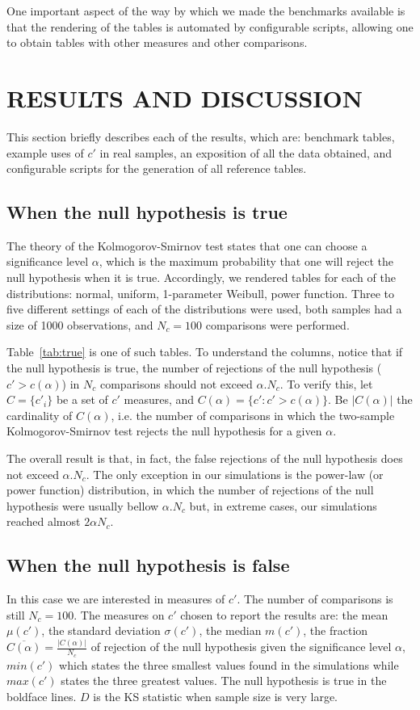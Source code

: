 \documentclass[12pt,fleqn]{article}
\begin{document}
One important aspect of the way by which we made the
benchmarks available is that the rendering of the tables
is automated by configurable scripts,
allowing one to obtain tables with other measures
and other comparisons.

\section{RESULTS AND DISCUSSION}\label{sec:res}
This section briefly describes each of the
results, which are: benchmark tables, example uses of $c'$ in
real samples, an exposition of all the data obtained,
and configurable scripts for the generation of all reference tables.

\subsection{When the null hypothesis is true}\label{sec:true}
The theory of the Kolmogorov-Smirnov test
states that one can choose a significance level $\alpha$,
which is the maximum probability that one will reject the
null hypothesis when it is true.
Accordingly,
we rendered tables for each of the distributions:
normal, uniform, 1-parameter Weibull, power function.
Three to five different settings of each of the distributions
were used, both samples had a size of 1000 observations,
and $N_c=100$ comparisons were performed.

Table~\ref{tab:true} is one of such tables.
To understand the columns, notice that
if the null hypothesis is true, the number
of rejections of the null hypothesis ($c'>c(\alpha)$)
in $N_c$ comparisons should not exceed $\alpha . N_c$.
To verify this, let $C=\{c'_i\}$ be a set of $c'$ measures,
and $C(\alpha)=\{c' : c'>c(\alpha)\}$.
Be $|C(\alpha)|$ the cardinality of $C(\alpha)$,
i.e. the number of comparisons in which the two-sample Kolmogorov-Smirnov
test rejects the null hypothesis for a given $\alpha$.

The overall result is that, in fact, the false rejections of the null hypothesis
does not exceed $\alpha . N_c$.
The only exception in our simulations is the power-law (or power function) distribution,
in which the number of rejections of the null hypothesis were usually bellow $\alpha . N_c$
but, in extreme cases, our simulations reached almost $2\alpha N_c$.



\subsection{When the null hypothesis is false}\label{sec:false}
In this case we are interested in measures of $c'$.
The number of comparisons is still $N_c=100$.
The measures on $c'$ chosen to report the results are:
the mean $\mu(c')$, the standard deviation $\sigma(c')$,
the median $m(c')$,
the  fraction
$\overline{C(\alpha)}=\frac{|C(\alpha)|}{N_c}$
of rejection of the null hypothesis given the significance level $\alpha$,
$min(c')$ which states the three smallest values found in the simulations while
$max(c')$ states the three greatest values.
The null hypothesis is true in the boldface lines.
$D$ is the KS statistic when sample size is very large.
\end{document}
